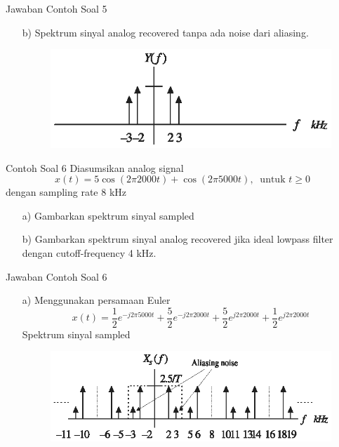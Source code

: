 \documentclass[pdflatex,compress,mathserif]{beamer}
\begin{document}
\begin{frame}{Jawaban Contoh Soal 5}
    \begin{enumerate}
        \item[b)] Spektrum sinyal analog recovered tanpa ada noise dari aliasing.
        \begin{figure}
            \includegraphics[width=\linewidth]{img/img19}
        \end{figure}
    \end{enumerate}
\end{frame}

\begin{frame}{Contoh Soal 6}
    Diasumsikan analog signal $$ x(t) = 5 \cos(2\pi 2000 t) + \cos(2\pi 5000t),~\text{ untuk } t \geq 0 $$ dengan sampling rate 8 kHz
    \begin{enumerate}
        \item[a)] Gambarkan spektrum sinyal sampled
        \item[b)] Gambarkan spektrum sinyal analog recovered jika ideal lowpass filter dengan cutoff-frequency 4 kHz.
    \end{enumerate}
\end{frame}

\begin{frame}{Jawaban Contoh Soal 6}
    \begin{enumerate}
        \item[a)] Menggunakan persamaan Euler
        $$x(t) = \frac{1}{2}e^{-j2 \pi 5000 t} + \frac{5}{2}e^{-j2 \pi 2000 t} + \frac{5}{2}e^{j2 \pi 2000 t} + \frac{1}{2}e^{j2 \pi 2000 t} $$
        Spektrum sinyal sampled
        \begin{figure}
            \includegraphics[width=\linewidth]{img/img20}
        \end{figure}
    \end{enumerate}
\end{frame}
\end{document}
